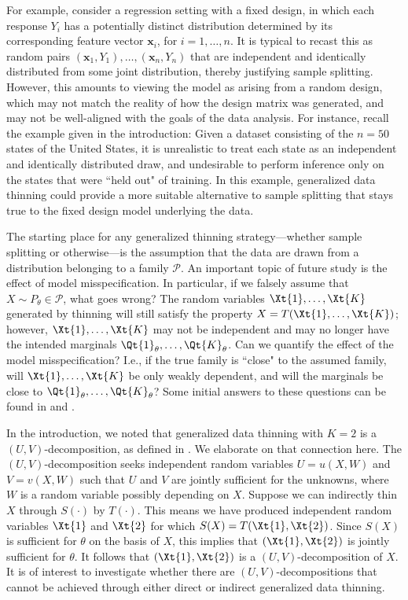 \documentclass[12pt]{article}
\begin{document}
For example, consider a regression setting with a fixed design, in which  each response $Y_i$ has a potentially distinct distribution determined by its corresponding feature vector $\mathbf{x}_i$, for $i=1,\ldots,n$.  It is typical to recast this as random pairs $(\mathbf{x}_1,Y_1),\ldots,(\mathbf{x}_n, Y_n)$ that are independent and identically distributed from some joint distribution, thereby justifying sample splitting.  However, this amounts to viewing the model as arising from a random design, which  may not match the reality of how the design matrix was generated, and may not be well-aligned with the goals of the data analysis.  For instance, recall the example given in the introduction: Given a dataset consisting of the  $n=50$ states of the United States, it is unrealistic to treat each state as an independent and identically distributed draw, and undesirable to perform inference only on the states that were ``held out" of training. In this example, generalized data thinning could provide a more suitable alternative to sample splitting that stays true to the fixed design model underlying the data. 

The starting place for any generalized thinning strategy---whether sample splitting or otherwise---is  the assumption that the data are drawn from a distribution belonging to a family $\mathcal P$.  
An important topic of future study is the effect of model misspecification.  In particular, if we falsely assume that $X\sim P_\theta\in\mathcal P$, 
what goes wrong?  The  random variables $\Xt{1},\ldots,\Xt{K}$ generated by thinning will still satisfy the property $X=T(\Xt{1},\ldots,\Xt{K})$; however, $\Xt{1},\ldots,\Xt{K}$ may not be independent and may no longer have the intended marginals $\Qt{1}_\theta,\ldots,\Qt{K}_\theta$.  Can we quantify the effect of the model misspecification?  I.e., if the true family is ``close" to the assumed family, will  $\Xt{1},\ldots,\Xt{K}$ be only weakly dependent, and will the marginals be close to $\Qt{1}_\theta,\ldots,\Qt{K}_\theta$? Some initial answers to these questions can be found in \cite{neufeld2023data} and \cite{rasines2021splitting}.

In the introduction, we noted that generalized data thinning with $K=2$  is a $(U,V)$-decomposition, as defined in \cite{rasines2021splitting}.  We elaborate on that connection here.  The $(U,V)$-decomposition seeks independent random variables $U=u(X,W)$ and $V=v(X,W)$ such that $U$ and $V$ are jointly sufficient for the unknowns, where $W$ is a random variable possibly depending on $X$.  Suppose we can indirectly thin $X$ through $S(\cdot)$ by $T(\cdot)$.  This means we have produced independent random variables $\Xt{1}$ and $\Xt{2}$ for which $S(X)=T(\Xt{1},\Xt{2})$.  Since $S(X)$ is sufficient for $\theta$ on the basis of $X$, this implies that $(\Xt{1},\Xt{2})$ is jointly sufficient for $\theta$.   It follows that $(\Xt{1},\Xt{2})$ is a $(U,V)$-decomposition of $X$.  It is of interest to investigate whether there are $(U,V)$-decompositions that cannot be achieved through either direct or indirect generalized data thinning.
\end{document}
